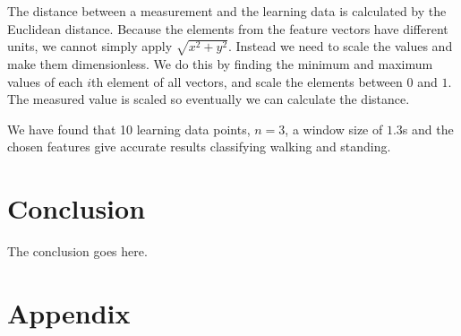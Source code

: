 \documentclass[journal]{IEEEtran}
\begin{document}
The distance between a measurement and the learning data is calculated by the
Euclidean distance. Because the elements from the feature vectors have
different units, we cannot simply apply $\sqrt{ x^2+y^2 }$. Instead we need to
scale the values and make them dimensionless. We do this by finding the minimum
and maximum values of each $i$th element of all vectors, and scale the elements
between $0$ and $1$. The measured value is scaled so eventually we can
calculate the distance.

We have found that 10 learning data points, $n=3$, a window size of $1.3$s
and the chosen features give accurate results classifying walking and standing.

\section{Conclusion}
The conclusion goes here.






%


\appendices
\section{Appendix}


\ifCLASSOPTIONcaptionsoff
  \newpage
\fi
\end{document}
